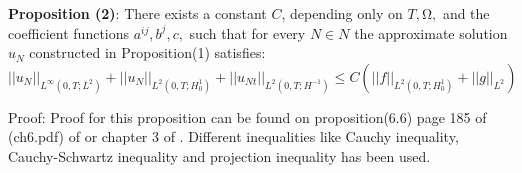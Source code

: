 \textbf{Proposition (2)}: There exists a constant $C$, depending only on $T , Ω,$ and the
coefficient functions $a^{ij}, b^j, c, $ such that for every $N \in N$ the approximate solution
$u_N$ constructed in Proposition(1) satisfies:
\begin{equation*}
    ||u_N||_{L^\infty(0,T;L^2)} +  ||u_N||_{L^2(0,T;H^1_0)} + ||u_{Nt}||_{L^2(0,T;H^{-1})} \leq C \left( ||f||_{L^2(0,T;H^1_0)} + ||g||_{L^2} \right)
\end{equation*}

Proof: Proof for this proposition can be found on proposition(6.6) page 185 of (ch6.pdf) of \cite{lecture2} or chapter 3 of \cite{ahmed}. Different inequalities like Cauchy inequality, Cauchy-Schwartz inequality and projection inequality has been used.










